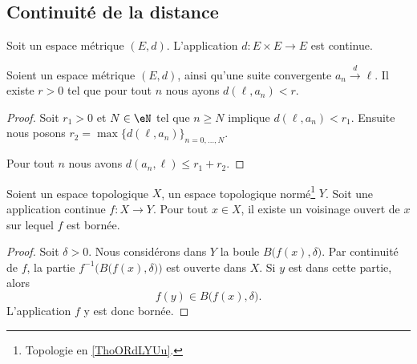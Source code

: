 \subsection{Continuité de la distance}


\begin{proposition}	\label{PROPooSZMLooNdtLLj}
	Soit un espace métrique \( (E,d)\). L'application \(d \colon E\times E\to E  \) est continue.
\end{proposition}


\begin{proposition}      \label{PROPooUXDJooCrWBbd}
	Soient un espace métrique \( (E,d)\), ainsi qu'une suite convergente \( a_n\stackrel{d}{\longrightarrow}\ell\). Il existe \( r>0\) tel que pour tout \( n\) nous ayons \( d(\ell, a_n)<r\).
\end{proposition}

\begin{proof}
	Soit \( r_1>0\) et \( N\in \eN\) tel que \( n\geq N\) implique \( d(\ell,a_n)<r_1\). Ensuite nous posons \( r_2=\max\{ d(\ell,a_n) \}_{n=0,\ldots, N}\).

	Pour tout \( n\) nous avons \( d(a_n,\ell)\leq r_1+r_2\).
\end{proof}

\begin{proposition}		\label{PROPooNOHQooTqBQLk}
	Soient un espace topologique \( X\), un espace topologique normé\footnote{Topologie en \ref{ThoORdLYUu}.} \( Y\). Soit une application continue \(f \colon X\to Y  \). Pour tout \( x\in X\), il existe un voisinage ouvert de \( x\) sur lequel \( f\) est bornée.
\end{proposition}

\begin{proof}
	Soit \( \delta>0\). Nous considérons dans \( Y\) la boule \( B\big( f(x),\delta \big)\). Par continuité de \( f\), la partie \( f^{-1}\Big( B\big( f(x),\delta \big) \Big)\) est ouverte dans \( X\). Si \( y\) est dans cette partie, alors
	\begin{equation}
		f(y)\in B\big( f(x),\delta \big).
	\end{equation}
	L'application \( f\) y est donc bornée.
\end{proof}

